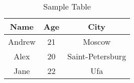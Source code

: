 \documentclass{article}
\begin{document}
\begin{table}[h]
\centering
\begin{tabular}{|c|c|c|}
\hline
Name & Age & City \\
\hline
Andrew & 21 & Moscow \\
\hline
Alex & 20 & Saint-Petersburg \\
\hline
Jane & 22 & Ufa \\
\hline
\end{tabular}
\caption{Sample Table}
\end{table}
\end{document}
